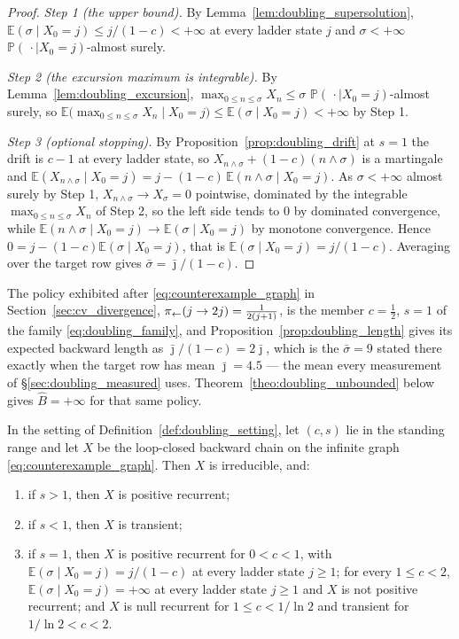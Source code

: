 \begin{proof}
\emph{Step 1 (the upper bound).} By Lemma~\ref{lem:doubling_supersolution},
$\mathbb E(\sigma\mid X_0=j)\leq j/(1-c)<+\infty$ at every ladder state $j$ and $\sigma<+\infty$
$\mathbb P(\,\cdot\mid X_0=j)$-almost surely.

\emph{Step 2 (the excursion maximum is integrable).} By Lemma~\ref{lem:doubling_excursion},
$\max_{0\leq n\leq\sigma}X_n\leq\sigma$ $\mathbb P(\,\cdot\mid X_0=j)$-almost surely, so
$\mathbb E\bigl(\max_{0\leq n\leq\sigma}X_n\mid X_0=j\bigr)\leq\mathbb E(\sigma\mid X_0=j)<+\infty$ by
Step 1.

\emph{Step 3 (optional stopping).} By Proposition~\ref{prop:doubling_drift} at $s=1$ the
drift is $c-1$ at every ladder state, so $X_{n\wedge\sigma}+(1-c)(n\wedge\sigma)$ is a
martingale and $\mathbb E(X_{n\wedge\sigma}\mid X_0=j)=j-(1-c)\,\mathbb E(n\wedge\sigma\mid X_0=j)$. As
$\sigma<+\infty$ almost surely by Step 1, $X_{n\wedge\sigma}\rightarrow X_\sigma=0$
pointwise, dominated by the integrable $\max_{0\leq n\leq\sigma}X_n$ of Step 2, so the left
side tends to $0$ by dominated convergence, while
$\mathbb E(n\wedge\sigma\mid X_0=j)\rightarrow\mathbb E(\sigma\mid X_0=j)$ by monotone convergence. Hence
$0=j-(1-c)\mathbb E(\sigma\mid X_0=j)$, that is $\mathbb E(\sigma\mid X_0=j)=j/(1-c)$. Averaging over the
target row gives $\bar\sigma=\bar\jmath/(1-c)$.
\end{proof}

The policy exhibited after \eqref{eq:counterexample_graph} in
Section~\ref{sec:cv_divergence}, $\pi_{\leftarrow}(j\rightarrow2j)=\frac1{2(j+1)}$, is the
member $c=\tfrac12$, $s=1$ of the family \eqref{eq:doubling_family}, and
Proposition~\ref{prop:doubling_length} gives its expected backward length as
$\bar\jmath/(1-c)=2\bar\jmath$, which is the $\bar\sigma=9$ stated there exactly when the target
row has mean $\bar\jmath=4.5$ --- the mean every measurement of \S\ref{sec:doubling_measured}
uses.
Theorem~\ref{theo:doubling_unbounded} below gives $\widehat B=+\infty$ for that same policy.

\begin{proposition}\label{prop:doubling_phase}
In the setting of Definition~\ref{def:doubling_setting}, let $(c,s)$ lie in the standing
range and let $X$ be the loop-closed backward chain on the infinite graph
\eqref{eq:counterexample_graph}. Then $X$ is irreducible, and:
\begin{enumerate}
    \item if $s>1$, then $X$ is positive recurrent;
    \item if $s<1$, then $X$ is transient;
    \item if $s=1$, then $X$ is positive recurrent for $0<c<1$, with
    $\mathbb E(\sigma\mid X_0=j)=j/(1-c)$ at every ladder state $j\geq1$; for every
    $1\leq c<2$, $\mathbb E(\sigma\mid X_0=j)=+\infty$ at every ladder state $j\geq1$ and $X$
    is not positive recurrent; and $X$ is null recurrent for $1\leq c<1/\ln2$ and transient
    for $1/\ln2<c<2$.
\end{enumerate}
\end{proposition}

